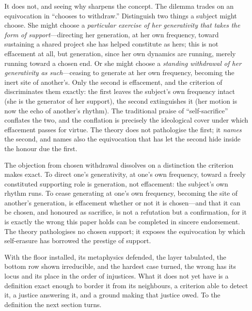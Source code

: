 It does not, and seeing why sharpens the concept. The dilemma trades on an equivocation in ``chooses to withdraw.'' Distinguish two things a subject might choose. She might choose a \emph{particular exercise of her generativity that takes the form of support}---directing her generation, at her own frequency, toward sustaining a shared project she has helped constitute as hers; this is not effacement at all, but generation, since her own dynamics are running, merely running toward a chosen end. Or she might choose a \emph{standing withdrawal of her generativity as such}---ceasing to generate at her own frequency, becoming the inert site of another's. Only the second is effacement, and the criterion of  discriminates them exactly: the first leaves the subject's own frequency intact (she is the generator of her support), the second extinguishes it (her motion is now the echo of another's rhythm). The traditional praise of ``self-sacrifice'' conflates the two, and the conflation is precisely the ideological cover under which effacement passes for virtue. The theory does not pathologise the first; it \emph{names} the second, and names also the equivocation that has let the second hide inside the honour due the first.

\begin{claim}
The objection from chosen withdrawal dissolves on a distinction the criterion makes exact. To direct one's generativity, at one's own frequency, toward a freely constituted supporting role is generation, not effacement: the subject's own rhythm runs. To cease generating at one's own frequency, becoming the site of another's generation, is effacement whether or not it is chosen---and that it can be chosen, and honoured as sacrifice, is not a refutation but a confirmation, for it is exactly the wrong this paper holds can be completed in sincere endorsement. The theory pathologises no chosen support; it exposes the equivocation by which self-erasure has borrowed the prestige of support.
\end{claim}

\noindent
With the floor installed, its metaphysics defended, the layer tabulated, the bottom row shown irreducible, and the hardest case turned, the wrong has its locus and its place in the order of injustices. What it does not yet have is a definition exact enough to border it from its neighbours, a criterion able to detect it, a justice answering it, and a ground making that justice owed. To the definition the next section turns.
